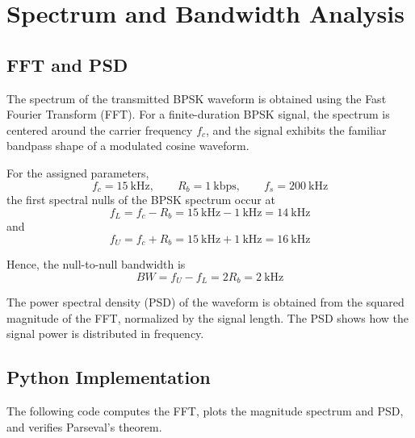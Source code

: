 \chapter{Spectrum and Bandwidth Analysis}

\section{FFT and PSD}
The spectrum of the transmitted BPSK waveform is obtained using the Fast Fourier Transform (FFT). 
For a finite-duration BPSK signal, the spectrum is centered around the carrier frequency \(f_c\), 
and the signal exhibits the familiar bandpass shape of a modulated cosine waveform.

For the assigned parameters,
\[
f_c = 15~\text{kHz}, \qquad R_b = 1~\text{kbps}, \qquad f_s = 200~\text{kHz}
\]
the first spectral nulls of the BPSK spectrum occur at
\[
f_{L} = f_c - R_b = 15~\text{kHz} - 1~\text{kHz} = 14~\text{kHz}
\]
and
\[
f_{U} = f_c + R_b = 15~\text{kHz} + 1~\text{kHz} = 16~\text{kHz}
\]

Hence, the null-to-null bandwidth is
\[
BW = f_U - f_L = 2R_b = 2~\text{kHz}
\]

The power spectral density (PSD) of the waveform is obtained from the squared magnitude of the FFT, normalized by the signal length. The PSD shows how the signal power is distributed in frequency.

\section{Python Implementation}
The following code computes the FFT, plots the magnitude spectrum and PSD, and verifies Parseval's theorem.


